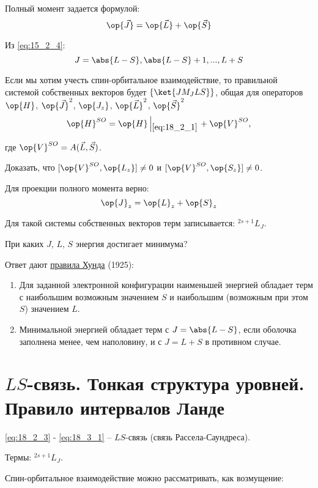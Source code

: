 Полный момент задается формулой:
\begin{equation}
\label{eq:18_3_1}
\op{\vec{J}} = \op{\vec{L}} + \op{\vec{S}}
\end{equation}

Из \eqref{eq:15_2_4}:
$$
J = \abs{L-S}, \abs{L-S} + 1, ..., L+S
$$

Если мы хотим учесть спин-орбитальное взаимодействие, то правильной системой собственных векторов будет $\{ \ket{J M_J L S}\}$, общая для операторов $\op{H}$, $\op{\vec{J}}^2$, $\op{J_z}$, $\op{\vec{L}}^2$, $\op{\vec{S}}^2$
\begin{gather*}
\op{H}^{SO} = \op{H} \left |_{\eqref{eq:18_2_1}} \right . + \op{V}^{SO},
\end{gather*}

где $\op{V}^{SO} = A(\vec{L}, \vec{S})$.

\begin{excr}
Доказать, что $[\op{V}^{SO}, \op{L_z}] \not = 0$ и $[\op{V}^{SO}, \op{S_z}] \not = 0$.
\end{excr}

Для проекции полного момента верно:
$$
\op{J}_z = \op{L}_z + \op{S}_z
$$

Для такой системы собственных векторов терм записывается: $\boxed{^{2s+1}L_J}$. 

При каких $J$, $L$, $S$ энергия достигает минимума?

Ответ дают \underline{правила Хунда} (1925):

\begin{enumerate}
\item Для заданной электронной конфигурации наименьшей энергией обладает терм с наибольшим возможным значением $S$ и наибольшим (возможным при этом $S$) значением $L$.
\item Минимальной энергией обладает терм с $J = \abs{L-S}$, если оболочка заполнена менее, чем наполовину, и с $J = L + S$ в противном случае.
\end{enumerate}

\section{$LS$-связь. Тонкая структура уровней. Правило интервалов Ланде}

\eqref{eq:18_2_3} - \eqref{eq:18_3_1} -- $LS$-связь (связь Рассела-Саундреса).

Термы: $^{2s+1}L_J$.

Спин-орбитальное взаимодействие можно рассматривать, как возмущение:

